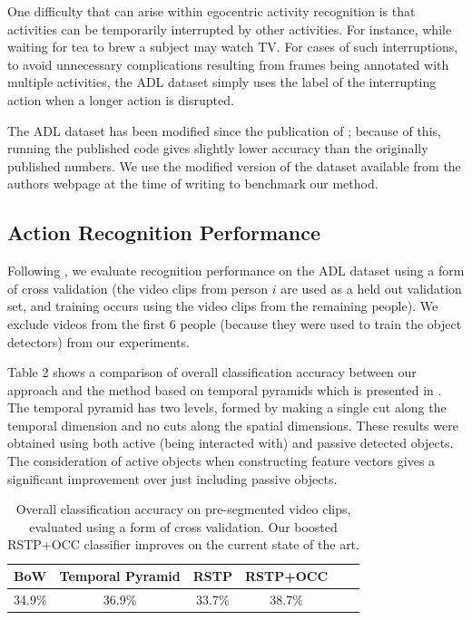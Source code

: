 \documentclass{bmvc2k}
\begin{document}
  One difficulty that can arise within egocentric
  activity recognition is that activities can be temporarily interrupted by
  other activities. For instance, while waiting for tea to brew a subject
  may watch TV. For cases of such interruptions, to avoid unnecessary
  complications resulting from frames being annotated with multiple
  activities, the ADL dataset simply uses the label of the interrupting
  action when a longer action is disrupted.
  

	The ADL dataset has been modified since the publication of
	\cite{Ramanan12}; because of this, running the published code gives
	slightly lower accuracy than the originally published numbers. We use the
  modified version of the dataset available from the authors webpage at the time of writing to
  benchmark our method.   \subsection{Action Recognition Performance}
  Following \cite{Ramanan12}, we evaluate recognition performance on the ADL
  dataset using a form of cross
	validation (the video clips from person $i$ are used as a held out validation set, and
	training occurs using the video clips from the remaining people).
  We exclude videos from the first 6 people
  (because they were used to train the object detectors) from our
  experiments.

	  Table 2 shows a comparison of overall classification accuracy between our
  approach and the method based on temporal pyramids which is
  presented in \cite{Ramanan12}. The temporal pyramid
  has two levels, formed by making a single cut along the temporal
  dimension and no cuts along the spatial dimensions.
  These results were obtained
  using both active (being interacted with) and passive detected objects.
  The consideration of active objects when constructing feature vectors
  gives a significant improvement over just including passive objects.

  \begin{table}
		\begin{center}
			\begin{tabular}{|l|c|c|c|c|c|}
				\hline
        BoW & Temporal Pyramid \cite{Ramanan12} & RSTP & RSTP+OCC \\
				\hline\hline
        34.9\% & 36.9\% & 33.7\% & 38.7\%\\
				\hline
			\end{tabular}
		\end{center}
		\caption{Overall classification accuracy on pre-segmented video clips,
    evaluated using a form of cross validation. Our boosted RSTP+OCC classifier
  improves on the current state of the art.}
	\end{table}
  
\end{document}
